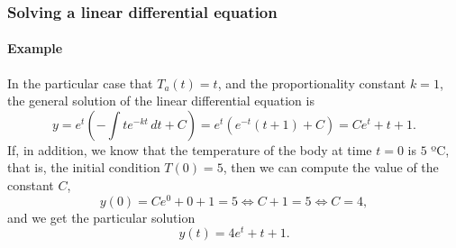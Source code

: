 \begin{frame}
\frametitle{Solving a linear differential equation}
\framesubtitle{Example}
In the particular case that $T_a(t)=t$, and the proportionality constant $k=1$, the general solution of the linear differential equation is
\[
y=e^{t}\left(-\int te^{-kt}\,dt+C\right)=e^t(e^{-t}(t+1)+C)=Ce^t+t+1.
\]
If, in addition, we know that the temperature of the body at time $t=0$ is $5$ ºC, that is, the initial condition $T(0)=5$, then we can compute the value of the constant $C$,
\[
y(0)=Ce^0+0+1=5 \Leftrightarrow C+1=5 \Leftrightarrow C=4,
\]
and we get the particular solution
\[
y(t)=4e^t+t+1.
\]
\end{frame}

